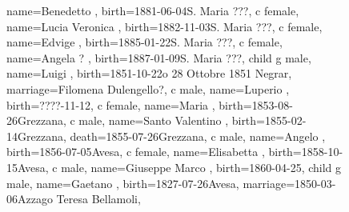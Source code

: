 \documentclass{article}
\begin{document}
\begin{figure}
\begin{genealogypicture}
{{{{{{                            name={Benedetto },
                            birth={1881-06-04}{S. Maria ???},
                        }
                        c{
                            female,
                            name={Lucia Veronica },
                            birth={1882-11-03}{S. Maria ???},
                        }
                        c{
                            female,
                            name={Edvige },
                            birth={1885-01-22}{S. Maria ???},
                        }
                        c{
                            female,
                            name={Angela ? },
                            birth={1887-01-09}{S. Maria ???},
                        }
                    }
                    child{
                        g{
                            male,
                            name={Luigi },
                            birth={1851-10-22}{o 28 Ottobre 1851 \newline Negrar},
                            marriage={Filomena Dulengello?}{},
                        }
                        c{
                            male,
                            name={Luperio },
                            birth={????-11-12}{},
                        }
                    }
                    c{
                        female,
                        name={Maria },
                        birth={1853-08-26}{Grezzana},
                    }
                    c{
                        male,
                        name={Santo Valentino },
                        birth={1855-02-14}{Grezzana},
                        death={1855-07-26}{Grezzana},
                    }
                    c{
                        male,
                        name={Angelo },
                        birth={1856-07-05}{Avesa},
                    }
                    c{
                        female,
                        name={Elisabetta },
                        birth={1858-10-15}{Avesa},
                    }
                    c{
                        male,
                        name={Giuseppe Marco },
                        birth={1860-04-25}{},
                    }
                }
                child{
                    g{
                        male,
                        name={Gaetano },
                        birth={1827-07-26}{Avesa},
                        marriage={1850-03-06}{Azzago \newline Teresa Bellamoli},
}}}}}
\end{genealogypicture}
\end{figure}
\end{document}
